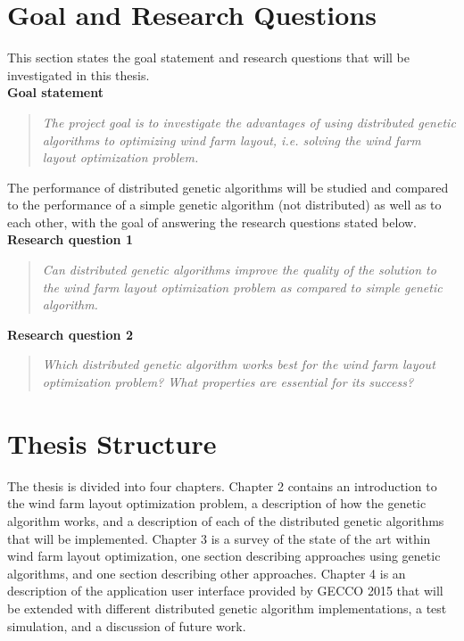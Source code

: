 \section{Goal and Research Questions}
This section states the goal statement and research questions that will be investigated in this thesis. \\


\noindent \textbf{Goal statement}


\begin{quote}
\textit{The project goal is to investigate the advantages of using distributed genetic algorithms to optimizing wind farm layout, i.e. solving the wind farm layout optimization problem.} \citep{Samorani}
\end{quote}


\noindent The performance of distributed genetic algorithms will be studied and compared to the performance of a simple genetic algorithm (not distributed) as well as to each other, with the goal of answering the research questions stated below.\\


\noindent \textbf{Research question 1}


\begin{quote}
\textit{Can distributed genetic algorithms improve the quality of the solution to the wind farm layout optimization problem as compared to simple genetic algorithm.}
\end{quote}


\noindent \textbf{Research question 2}


\begin{quote}
\textit{Which distributed genetic algorithm works best for the wind farm layout optimization problem? What properties are essential for its success?}
\end{quote}


\section{Thesis Structure}
The thesis is divided into four chapters. Chapter 2 contains an introduction to the wind farm layout optimization problem, a description of how the genetic algorithm works, and a description of each of the distributed genetic algorithms that will be implemented. Chapter 3 is a survey of the state of the art within wind farm layout optimization, one section describing approaches using genetic algorithms, and one section describing other approaches. Chapter 4 is an description of the application user interface provided by GECCO 2015 that will be extended with different distributed genetic algorithm implementations, a test simulation, and a discussion of future work. 